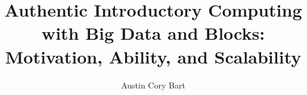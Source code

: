 \documentclass[onecolumn,12pt]{article}
\begin{document}
    
\title{Authentic Introductory Computing with Big Data and Blocks: Motivation, Ability, and Scalability} 

\author{Austin Cory Bart}
\maketitle     

\newpage
\tableofcontents

\newpage   

    
\newpage
{}
\setcounter{page}{1}
        
    
    
    
    
    
    
    
    
    
		
    
\newpage
		
		
\newpage
\setcounter{page}{1}

    
    
    
        
\end{document}
